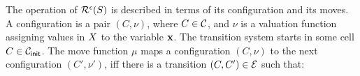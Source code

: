 

The operation of $\mathcal{R}^{\epsilon}(S)$ is described in
terms of its configuration and its moves. A configuration is a pair
$(C, \nu)$, where $C \in \mathcal{C}$, and $\nu$ is a valuation function
assigning values in $X$ to the variable $\mathbf{x}$.  The
transition system starts in some cell $C \in \mathcal{C}_{\mathsf{init}}$.  The move
function $\mu$ maps a configuration $(C,\nu)$ to the next
configuration $(C',\nu')$, iff there is a transition $(C,C') \in
\mathcal{E}$ such that:
